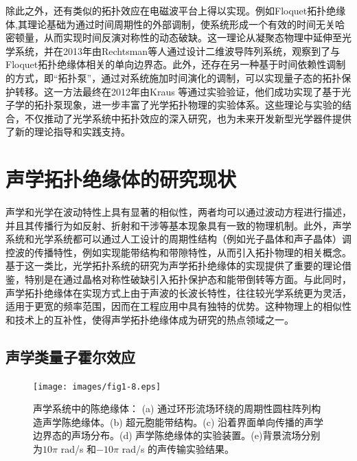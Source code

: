 除此之外，还有类似的拓扑效应在电磁波平台上得以实现。例如Floquet拓扑绝缘体,其理论基础为通过时间周期性的外部调制，使系统形成一个有效的时间无关哈密顿量，从而实现时间反演对称性的动态破缺\cite{g4,g5}。这一理论从凝聚态物理中延伸至光学系统，并在2013年由Rechtsman等人通过设计二维波导阵列系统，观察到了与Floquet拓扑绝缘体相关的单向边界态\cite{g7}。此外，还存在另一种基于时间依赖性调制的方式，即“拓扑泵”\cite{g8}，通过对系统施加时间演化的调制，可以实现量子态的拓扑保护转移。这一方法最终在2012年由Kraus 等通过实验验证，他们成功实现了基于光子学的拓扑泵现象，进一步丰富了光学拓扑物理的实验体系\cite{g9}。这些理论与实验的结合，不仅推动了光学系统中拓扑效应的深入研究，也为未来开发新型光学器件提供了新的理论指导和实践支持\cite{h1,h2,h3,h4,h7,h8,h9,h10,h11,h12,h13,h14,h15,h16,h17}。


\section{声学拓扑绝缘体的研究现状}

声学和光学在波动特性上具有显著的相似性，两者均可以通过波动方程进行描述，并且其传播行为如反射、折射和干涉等基本现象具有一致的物理机制。此外，声学系统和光学系统都可以通过人工设计的周期性结构（例如光子晶体和声子晶体）调控波的传播特性，例如实现能带结构和带隙特性，从而引入拓扑物理的相关概念。基于这一类比，光学拓扑系统的研究为声学拓扑绝缘体的实现提供了重要的理论借鉴，特别是在通过晶格对称性破缺引入拓扑保护态和能带倒转等方面。与此同时，声学拓扑绝缘体在实现方式上由于声波的长波长特性，往往较光学系统更为灵活，适用于更宽的频率范围，因而在工程应用中具有独特的优势。这种物理上的相似性和技术上的互补性，使得声学拓扑绝缘体成为研究的热点领域之一。

\subsection{声学类量子霍尔效应}

\begin{figure}[h!]
    \centering
    \texttt{[image: images/fig1-8.eps]} 
    \caption{声学系统中的陈绝缘体：
    (a) 通过环形流场环绕的周期性圆柱阵列构造声学陈绝缘体。(b) 超元胞能带结构。(c) 沿着界面单向传播的声学边界态的声场分布。(d) 声学陈绝缘体的实验装置\cite{i-add-1}。(e)背景流场分别为$10\pi$ rad/s 和$-10\pi$ rad/s 的声传输实验结果。
    }
    \label{fig_1_8}
\end{figure}

